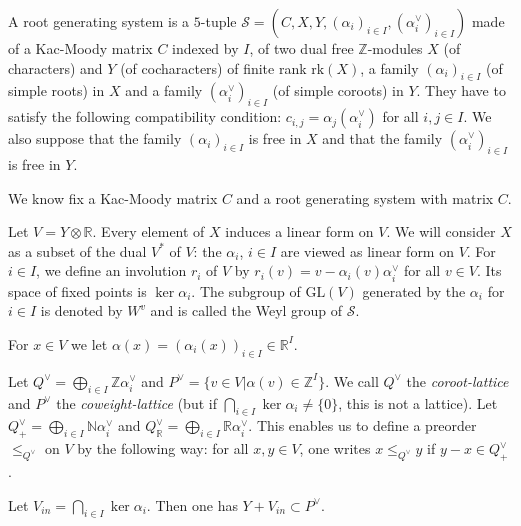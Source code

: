 \documentclass[12pt]{article}
\theoremstyle{plain}
\theoremstyle{definition}
\newcommand{\R}{\mathbb{R}}
\newcommand{\N}{\mathbb{N}}
\newcommand{\Z}{\mathbb{Z}}
\begin{document}
A root generating system is a $5$-tuple $\mathcal{S}=(C,X,Y,(\alpha_i)_{i\in I},(\alpha_i^\vee)_{i\in I})$ made of a Kac-Moody matrix $C$ indexed by $I$, of two dual free $\Z$-modules $X$ (of characters) and $Y$ (of cocharacters) of finite rank $\mathrm{rk}(X)$, a family $(\alpha_i)_{i\in I}$ (of simple roots) in $X$ and a family $(\alpha_i^\vee)_{i\in I}$ (of simple coroots) in $Y$. They have to satisfy the following compatibility condition: $c_{i,j}=\alpha_j(\alpha_i^\vee)$ for all $i,j\in I$. We also suppose that the family $(\alpha_i)_{i\in I}$ is free in $X$ and that the family $(\alpha_i^\vee)_{i\in I}$ is free in $Y$.



 We know fix a Kac-Moody matrix $C$ and a root generating system with matrix $C$.



Let $V=Y\otimes \R$. Every element of $X$ induces a linear form on $V$. We will consider $X$ as a subset of the dual $V^*$ of $V$: the $\alpha_i$, $i\in I$ are viewed as linear form on $V$. For $i\in I$, we define an involution $r_i$ of $V$ by $r_i(v)=v-\alpha_i(v)\alpha_i^\vee$ for all $v\in V$. Its space of fixed points is $\ker \alpha_i$. The subgroup of $\mathrm{GL}(V)$ generated by the $\alpha_i$ for $i\in I$ is denoted by $W^v$ and is called the Weyl group of $\mathcal S$.


For $x\in V$ we let $\alpha(x)=(\alpha_i(x))_{i\in I}\in \R^I$.

Let  $Q^\vee=\bigoplus_{i\in I}\Z\alpha_i^\vee$ and $P^\vee=\{v\in V |\alpha(v)\in \Z^I\}$. We call  $Q^\vee$ the \textit{coroot-lattice} and $P^\vee$ the \textit{coweight-lattice} (but if $\bigcap_{i\in I}\ker \alpha_i\neq \{0\}$, this is not a lattice). Let $Q_+^\vee=\bigoplus_{i\in I}\N \alpha_i^\vee$ and $Q^\vee_{\mathbb{R}}=\bigoplus_{i\in I}\R\alpha_i^\vee$. This enables us to define a preorder $\leq_{Q^\vee}$ on $V$ by the following way: for all $x,y\in V$, one writes $x\leq_{Q^\vee}y$ if $y-x\in Q^\vee_+$. 




Let $V_{in}=\bigcap_{i\in I}\ker \alpha_i$. Then one has $Y+V_{in}\subset P^\vee$. 
\end{document}

